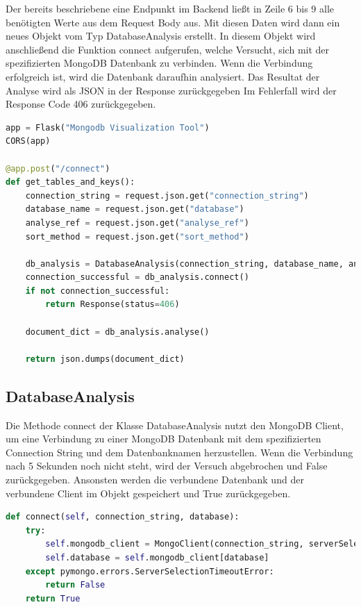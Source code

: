 Der bereits beschriebene eine Endpunkt im Backend ließt in Zeile 6 bis 9 alle benötigten Werte aus dem Request Body aus.
Mit diesen Daten wird dann ein neues Objekt vom Typ DatabaseAnalysis erstellt.
In diesem Objekt wird anschließend die Funktion connect aufgerufen, welche Versucht, sich mit der spezifizierten MongoDB Datenbank zu verbinden.
Wenn die Verbindung erfolgreich ist, wird die Datenbank daraufhin analysiert.
Das Resultat der Analyse wird als JSON in der Response zurückgegeben
Im Fehlerfall wird der Response Code 406 zurückgegeben.

\begin{lstlisting}[language=python, caption={app.py},label={lst:backend_app}]
app = Flask("Mongodb Visualization Tool")
CORS(app)

@app.post("/connect")
def get_tables_and_keys():
    connection_string = request.json.get("connection_string")
    database_name = request.json.get("database")
    analyse_ref = request.json.get("analyse_ref")
    sort_method = request.json.get("sort_method")

    db_analysis = DatabaseAnalysis(connection_string, database_name, analyse_ref, sort_method)
    connection_successful = db_analysis.connect()
    if not connection_successful:
        return Response(status=406)

    document_dict = db_analysis.analyse()

    return json.dumps(document_dict)
\end{lstlisting}

\subsection{DatabaseAnalysis}
\label{sub:ba_database_analysis}

Die Methode connect der Klasse DatabaseAnalysis nutzt  den MongoDB Client, um eine Verbindung zu einer MongoDB Datenbank mit dem spezifizierten Connection String und dem Datenbanknamen herzustellen.
Wenn die Verbindung nach 5 Sekunden noch nicht steht, wird der Versuch abgebrochen und False zurückgegeben.
Ansonsten werden die verbundene Datenbank und der verbundene Client im Objekt gespeichert und True zurückgegeben.

\begin{lstlisting}[language=python, caption={DatabaseAnalysis.connect},label={lst:backend_connect}]
def connect(self, connection_string, database):
    try:
        self.mongodb_client = MongoClient(connection_string, serverSelectionTimeoutMS=5000)
        self.database = self.mongodb_client[database]
    except pymongo.errors.ServerSelectionTimeoutError:
        return False
    return True
\end{lstlisting}

